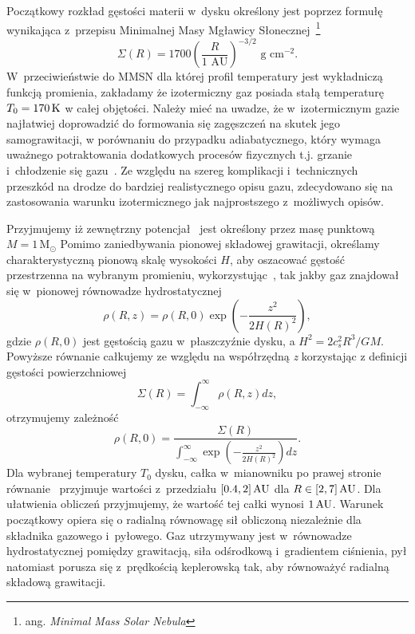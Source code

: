 \par Początkowy rozkład gęstości materii w~dysku określony jest poprzez formułę
wynikająca z~przepisu Minimalnej Masy Mgławicy Słonecznej~\footnote{ang.
\emph{Minimal Mass Solar Nebula}}~\cite{H81}
\begin{equation}\label{eq:mmsn}
   \Sigma(R) = 1700 \left(\frac{R}{1\textrm{ AU}}\right)^{-3/2} 
   \textrm{ g cm}^{-2}.
\end{equation}
W~przeciwieństwie do MMSN dla której profil temperatury jest wykładniczą funkcją
promienia, zakładamy że izotermiczny gaz posiada stałą temperaturę $T_0 = 170\hbox{$\thinspace\textrm{K}$}$
w całej objętości. Należy mieć na uwadze, że w~izotermicznym gazie najłatwiej
doprowadzić do formowania się zagęszczeń na skutek jego samograwitacji, w
porównaniu do przypadku adiabatycznego, który wymaga uważnego potraktowania
dodatkowych procesów fizycznych t.j. grzanie i~chłodzenie się gazu~\cite{Nel00}.
Ze względu na szereg komplikacji i~technicznych przeszkód na drodze do bardziej
realistycznego opisu gazu, zdecydowano się na zastosowania warunku
izotermicznego jak najprostszego z~możliwych opisów.
\par Przyjmujemy iż zewnętrzny potencjał~ jest określony przez
masę punktową $M=1\,\textrm{M}_\odot$ Pomimo zaniedbywania pionowej składowej
grawitacji, określamy charakterystyczną pionową skalę wysokości $H$, aby
oszacować gęstość przestrzenna na wybranym promieniu,
wykorzystując~, tak jakby gaz znajdował się w~pionowej równowadze
hydrostatycznej
%
\begin{equation}\label{eq:rhoR}
   \rho(R,z) =  \rho(R,0) \exp\left(-\frac{z^2}{2H(R)^2}\right),
\end{equation}
gdzie $\rho(R,0)$ jest gęstością gazu w~płaszczyźnie dysku, a $H^2 = 2 c_s^2 R^3/
GM$.
%
Powyższe równanie całkujemy ze względu na współrzędną \emph{z} korzystając z
definicji gęstości powierzchniowej
\begin{equation} \label{eq:sigmaR}
   \Sigma(R) = \int_{-\infty}^\infty \rho(R,z) dz,
\end{equation}
%
otrzymujemy zależność
\begin{equation}
   \label{eq:rho}
    \rho(R,0) = \frac{\Sigma(R) }{\int_{-\infty}^\infty
   \exp\left(-\frac{z^2}{2H(R)^2}\right) dz}.
\end{equation}
Dla wybranej temperatury $T_0$ dysku, całka w~mianowniku po prawej stronie
równanie~ przyjmuje wartości z~przedziału $[0.4,2]\hbox{$\thinspace\textrm{AU}$}$ dla $R \in
[2,7]\hbox{$\thinspace\textrm{AU}$}$. Dla ułatwienia obliczeń przyjmujemy, że wartość tej całki wynosi $1\hbox{$\thinspace\textrm{AU}$}$.
Warunek początkowy opiera się o radialną równowagę sił obliczoną niezależnie dla
składnika gazowego i~pyłowego. Gaz utrzymywany jest w~równowadze hydrostatycznej
pomiędzy grawitacją, siła odśrodkową i~gradientem ciśnienia, pył natomiast
porusza się z~prędkością keplerowską tak, aby równoważyć radialną składową
grawitacji.

